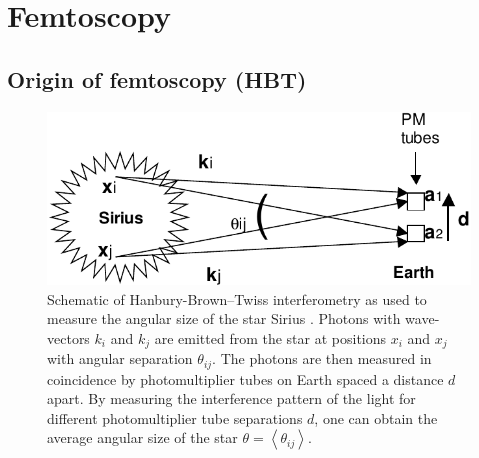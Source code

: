 \section{Femtoscopy}
\label{sec:Femtoscopy}

\subsection{Origin of femtoscopy (HBT)}
\label{sec:OriginAsHBT}

\begin{figure}[hbt]
\includegraphics[width=36pc]{Figures/BorrowedFigures/SiriusHBT.pdf}
\caption[Schematic of Hanbury-Brown--Twiss interferometry in astronomy]{Schematic of Hanbury-Brown--Twiss interferometry as used to measure the angular size of the star Sirius \cite{Humanic:2005ye}.
Photons with wave-vectors $k_i$ and $k_j$ are emitted from the star at positions $x_i$ and $x_j$ with angular separation $\theta_{ij}$. The photons are then measured in coincidence by photomultiplier tubes on Earth spaced a distance $d$ apart.
By measuring the interference pattern of the light for different photomultiplier tube separations $d$, one can obtain the average angular size of the star $\theta = \left\langle \theta_{ij} \right\rangle$.
}
\label{fig:SiriusHBT}
\end{figure}
